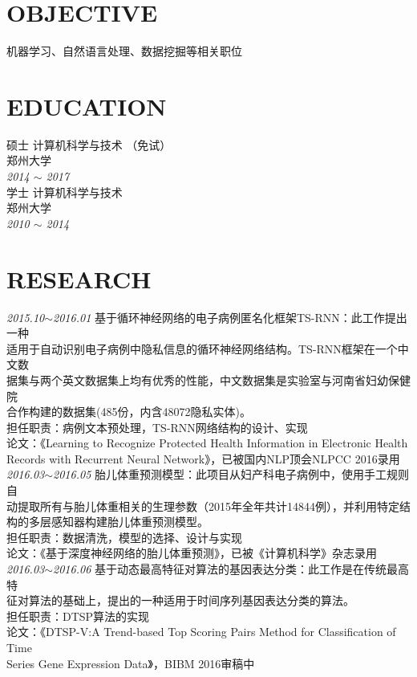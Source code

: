 \documentclass[line, margin]{res}
\newcommand{\xiaowu}{\fontsize{9pt}{15.75pt}\selectfont} %
\begin{document}
\address{likun@stu.zzu.edu.cn}
\address{152-2511-1797}

\begin{resume}
\vspace {5pt}
\section{OBJECTIVE}
 { 机器学习、自然语言处理、数据挖掘等相关职位}

\section{EDUCATION} 
 { 硕士 计算机科学与技术 （免试）  \\
 郑州大学 }\\
 {\sl 2014 $\sim$ 2017} \\
[15pt]
 { 学士 计算机科学与技术 \\
 郑州大学 } \\
 {\sl 2010 $\sim$ 2014 }

\section{RESEARCH}
 {
 {\sl 2015.10$\sim$2016.01} 基于循环神经网络的电子病例匿名化框架TS-RNN：{ 此工作提出一种\\
 适用于自动识别电子病例中隐私信息的循环神经网络结构。TS-RNN框架在一个中文数\\
 据集与两个英文数据集上均有优秀的性能，中文数据集是实验室与河南省妇幼保健院\\
 合作构建的数据集(485份，内含48072隐私实体)。} \\
 {\xiaowu 担任职责：病例文本预处理，TS-RNN网络结构的设计、实现}\\
 {\xiaowu 论文：《Learning to Recognize Protected Health Information in  Electronic Health\\
 Records with Recurrent Neural Network》，已被国内NLP顶会NLPCC 2016录用}\\
[9pt]
 {\sl 2016.03$\sim$2016.05} 胎儿体重预测模型：{ 此项目从妇产科电子病例中，使用手工规则自\\
 动提取所有与胎儿体重相关的生理参数（2015年全年共计14844例），并利用特定结\\
 构的多层感知器构建胎儿体重预测模型。} \\
 {\xiaowu 担任职责：数据清洗，模型的选择、设计与实现}\\
 {\xiaowu 论文：《基于深度神经网络的胎儿体重预测》，已被《计算机科学》杂志录用} \\
[9pt]
 {\sl 2016.03$\sim$2016.06} 基于动态最高特征对算法的基因表达分类：{ 此工作是在传统最高特\\
 征对算法的基础上，提出的一种适用于时间序列基因表达分类的算法。}\\
 {\xiaowu 担任职责：DTSP算法的实现}\\
 {\xiaowu 论文：《DTSP-V:A Trend-based Top Scoring Pairs Method for Classification of Time\\
  Series Gene Expression Data》，BIBM 2016审稿中} }


\end{resume}
\end{document}
